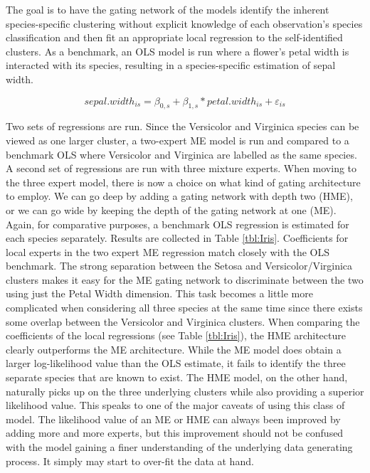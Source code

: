 \documentclass[12pt]{article}
\theoremstyle{definition}
\begin{document}
The goal is to have the gating network of the 
models identify the inherent species-specific clustering without explicit
knowledge of each observation's species classification and then fit an
appropriate local regression to the self-identified clusters. As a benchmark,
an OLS model is run where a flower's petal width is interacted with its species,
resulting in a species-specific estimation of sepal width.

\begin{equation} \label{eq:OLS_iris}
    sepal.width_{is} = \beta_{0,s} + \beta_{1, s} * petal.width_{is} + \varepsilon_{is}
\end{equation}

Two sets of regressions are run. Since the Versicolor and Virginica species
can be viewed as one larger cluster, a two-expert ME model is run
and compared to a benchmark OLS where Versicolor and Virginica are labelled
as the same species. A second set of regressions are run with three mixture
experts. When moving to the three expert model, there is now a choice
on what kind of gating architecture to employ. We can go deep by adding 
a gating network with depth two (HME), or we can go wide by keeping the
depth of the gating network at one (ME). Again, for comparative purposes, a benchmark
OLS regression is estimated for each species separately. Results are collected in Table \ref{tbl:Iris}.
Coefficients for local experts in the two expert ME regression match closely with the OLS
benchmark. The strong separation between the Setosa and Versicolor/Virginica
clusters makes it easy for the ME gating network to discriminate between the two using
just the Petal Width dimension. This task becomes a little more complicated when
considering all three species at the same time since there exists some overlap
between the Versicolor and Virginica clusters. When comparing the coefficients of the
local regressions (see Table \ref{tbl:Iris}), the HME architecture clearly
outperforms the ME architecture. While the ME model does obtain a larger
log-likelihood value than the OLS estimate, it fails to identify the three
separate species that are known to exist. The HME model, on the other hand,
naturally picks up on the three underlying clusters while also providing a superior
likelihood value. This speaks to one of the major caveats of using this class of model.
The likelihood value of an ME or HME can always been improved by adding more and
more experts, but this improvement should not be confused with the model gaining a
finer understanding of the underlying data generating process. It simply may start to
over-fit the data at hand.
\end{document}
